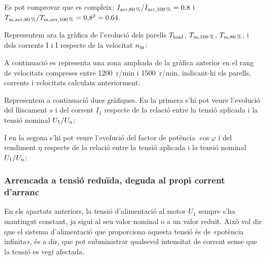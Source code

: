 \begin{exemple}
	Es pot comprovar que es compleix: $I_\mathrm{arr,\SI{80}{\%}} / I_\mathrm{arr,\SI{100}{\%}} = 0{,}8$ i $T_\mathrm{m,arr,\SI{80}{\%}} / T_\mathrm{m,arr,\SI{100}{\%}} = 0{,}8^2 = 0{,}64$.
		
 	Representem ara la gràfica de l'evolució dels parells $T_\mathrm{load}$,  $T_\mathrm{m,\SI{100}{\%}}$,  $T_\mathrm{m,\SI{80}{\%}}$, i dels	corrents I i I respecte de la velocitat $n_\mathrm{m}$:	
    \begin{center}
		\fontsize{10pt}{11pt}\selectfont
		
	\end{center}	

	\vspace{-2mm}
	A continuació es representa una zona ampliada de la gràfica anterior en el rang de velocitats compreses entre \SI{1200}{r/min} i  \SI{1500}{r/min}, indicant-hi els parells, corrents i velocitats calculats anteriorment:

	\begin{center}
		\fontsize{10pt}{11pt}\selectfont
		
	\end{center}

	Representem a continuació dues gràfiques. En la primera s'hi pot veure  l'evolució del lliscament $s$ i del corrent $I_1$ respecte de la relació entre la tensió aplicada i la tensió nominal $U_1/U_\mathrm{n}$:
	\begin{center}
		
	\end{center}
	
	I en la segona s'hi pot veure l'evolució del factor de potència $\cos\varphi$ i del rendiment $\eta$ respecte de la relació entre la tensió aplicada i la tensió nominal $U_1/U_\mathrm{n}$:
	\begin{center}
		
	\end{center}
\end{exemple} 


\subsubsection{Arrencada a tensió reduïda, deguda al propi corrent d'arranc}

En els apartats anteriors, la tensió d'alimentació al motor $U_1$ sempre s'ha mantingut constant, ja sigui al seu valor nominal o a un valor reduït. Això vol dir que el sistema d'alimentació que proporciona aquesta tensió és de «potència infinita», és a dir, que pot subministrar qualsevol intensitat de corrent sense que la tensió es vegi afectada.

